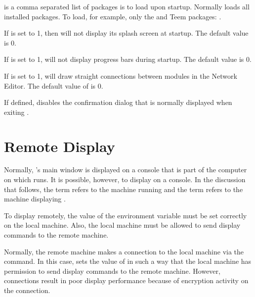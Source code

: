 \begin{description}
   is a comma separated list of packages
  \sr{} is to load upon startup.  Normally \sr{} loads all installed
  packages.  To load, for example, only the \BIOPSE{} and Teem
  packages: .

  If  is set to 1, then \sr{} will not display
  its splash screen at startup.  The default value is 0.

  If  is set to 1, \sr{} will not display
  progress bars during startup.  The default value is 0.
  
  If  is set to 1, \sr{} will draw
  straight connections between modules in the Network Editor.  The
  default value of  is 0.

   If defined, disables the confirmation
  dialog that is normally displayed when exiting \sr.
  
\end{description}

\section{Remote Display}
\label{sec:remote-display}

Normally, \sr{}'s main window is displayed on a console that is part
of the computer on which \sr{} runs.  It is possible, however, to
display \sr{} on a  console.  In the discussion that
follows, the term  refers to the machine running \sr{} and
the term  refers to the machine displaying \sr{}.

To display \sr{} remotely, the value of the 
environment variable must be set correctly on the local machine.
Also, the local machine must be allowed to send display commands to
the remote machine.
  
Normally, the remote machine makes a connection to the local machine
via the  command.  In this case,  sets the value of
 in such a way that the local machine has permission to
send display commands to the remote machine.  However, 
connections result in poor display performance because of encryption
activity on the connection.

